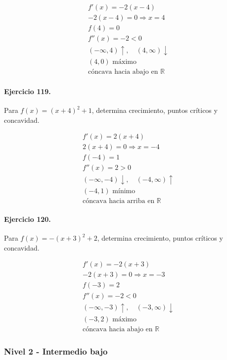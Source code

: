 \documentclass[11pt,a4paper]{article}
\begin{document}
\[
\begin{aligned}
f'(x)=-2(x-4)\\
-2(x-4)=0\Rightarrow x=4\\
f(4)=0\\
f''(x)=-2<0\\
(-\infty,4)\uparrow,\quad(4,\infty)\downarrow\\
(4,0)\text{ máximo}\\
\text{{cóncava hacia abajo en }}\mathbb{R}
\end{aligned}
\]


\paragraph{Ejercicio 119.} Para $f(x)=(x+4)^2+1$, determina crecimiento, puntos críticos y concavidad.

\[
\begin{aligned}
f'(x)=2(x+4)\\
2(x+4)=0\Rightarrow x=-4\\
f(-4)=1\\
f''(x)=2>0\\
(-\infty,-4)\downarrow,\quad(-4,\infty)\uparrow\\
(-4,1)\text{ mínimo}\\
\text{{cóncava hacia arriba en }}\mathbb{R}
\end{aligned}
\]


\paragraph{Ejercicio 120.} Para $f(x)=-(x+3)^2+2$, determina crecimiento, puntos críticos y concavidad.

\[
\begin{aligned}
f'(x)=-2(x+3)\\
-2(x+3)=0\Rightarrow x=-3\\
f(-3)=2\\
f''(x)=-2<0\\
(-\infty,-3)\uparrow,\quad(-3,\infty)\downarrow\\
(-3,2)\text{ máximo}\\
\text{{cóncava hacia abajo en }}\mathbb{R}
\end{aligned}
\]


\newpage

\subsubsection*{Nivel 2 - Intermedio bajo}
\end{document}

